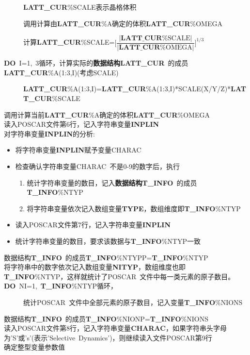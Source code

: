 \documentclass{article}      %
\begin{document}
\begin{description}
	\item[] \textbf{LATT\_CUR}\%\textrm{SCALE}表示晶格体积
	\item[] 调用计算由\textbf{LATT\_CUR}\%\textrm{A}确定的体积\textbf{LATT\_CUR}\%\textrm{OMEGA}
	\item[] 计算\textbf{LATT\_CUR}\%\textrm{SCALE}=$\bigg[\dfrac{|\mathbf{LATT\_CUR}\%\mathrm{SCALE}|}{|\mathbf{LATT\_CUR}\%\mathrm{OMEGA}|}\bigg]^{1/3}$
\end{description}
\textbf{DO}~\textrm{I}=1,~3循环，计算实际的\textbf{数据结构LATT\_CUR}~的成员\textbf{LATT\_CUR}\%\textrm{A(1:3,I)}(考虑\textrm{SCALE})
\begin{description}
	\item[]\textbf{LATT\_CUR}\%\textrm{A(1:3,I)}=\textbf{LATT\_CUR}\%\textrm{A(1:3,I)}*\textrm{SCALE(X/Y/Z)}*\textbf{LATT\_CUR}\%\textrm{SCALE}
\end{description}
调用计算当前\textbf{LATT\_CUR}\%\textrm{A}确定的体积\textbf{LATT\_CUR}\%\textrm{OMEGA}\\
读入\textrm{POSCAR}文件第6行，记入字符串变量\textbf{INPLIN}\\
对字符串变量\textbf{INPLIN}的分析:~
\begin{itemize}
	\item 将字符串变量\textbf{INPLIN}赋予变量\textrm{CHARAC}
	\item 检查确认字符串变量\textrm{CHARAC~}不是0-9的数字后，执行
		\begin{enumerate}
			\item 统计字符串变量的数目，记入\textbf{数据结构T\_INFO}~的成员\textbf{T\_INFO}\%\textrm{NTYP}
			\item 将字符串变量依次记入数组变量\textbf{TYPE}，数组维度即\textbf{T\_INFO}\%\textrm{NTYP}
		\end{enumerate}
	\item 读入\textrm{POSCAR}文件第7行，记入字符串变量\textbf{INPLIN}
	\item 统计字符串变量的数目，要求该数据与\textbf{T\_INFO}\%\textrm{NTYP}一致
\end{itemize}
数据结构\textbf{T\_INFO}~的成员\textbf{T\_INFO}\%\textrm{NTYPP}=\textbf{T\_INFO}\%\textrm{NTYP}\\
将字符串中的数字依次记入数组变量\textbf{NITYP}，数组维度也即\textbf{T\_INFO}\%\textrm{NTYP}，这样就统计了\textrm{POSCAR~}文件中每一类元素的原子数目。\\
\textbf{DO}~\textrm{NI}=1,~\textbf{T\_INFO}\%\textrm{NTYP}循环，
\begin{description}
	\item[] 统计\textrm{POSCAR~}文件中全部元素的原子数目，记入变量\textbf{T\_INFO}\%\textrm{NIONS}
\end{description}
数据结构\textbf{T\_INFO}~的成员\textbf{T\_INFO}\%\textrm{NIONP}=\textbf{T\_INFO}\%\textrm{NIONS}\\
读入\textrm{POSCAR}文件第8行，记入字符串变量\textbf{CHARAC}，如果字符串头字母为'S'或's'(表示'\textrm{Selective~Dynamics}')，则继续读入文件\textrm{POSCAR}第9行\\
确定整型变量参数值
\end{document}
